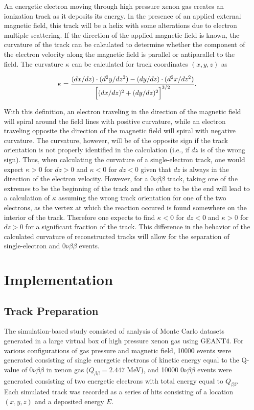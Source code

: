 \documentclass{JINST}
\begin{document}
An energetic electron moving through high pressure xenon gas creates an ionization track as it deposits its energy.  In the presence of an applied external magnetic field, this track will be a helix with some alterations due to electron multiple scattering.  If the direction of the applied magnetic field is known, the curvature of the track can be calculated to determine whether the component of the electron velocity along the magnetic field is parallel or antiparallel to the field.  The curvature $\kappa$ can be calculated for track coordinates $(x,y,z)$ as

\begin{equation}\label{eqn_curv}
\kappa = \frac{(dx/dz)\cdot(d^2y/dz^2) - (dy/dz)\cdot(d^2x/dz^2)}{\Bigl[(dx/dz)^2 + (dy/dz)^2\Bigr]^{3/2}}.
\end{equation}

With this definition, an electron traveling in the direction of the magnetic field will spiral around the field lines with positive curvature, while an electron traveling opposite the direction of the magnetic field will spiral with negative curvature.  The curvature, however, will be of the opposite sign if the track orientation is not properly identified in the calculation (i.e., if $dz$ is of the wrong sign).  Thus, when calculating the curvature of a single-electron track, one would expect $\kappa > 0$ for $dz > 0$ and $\kappa < 0$ for $dz < 0$ given that $dz$ is always in the direction of the electron velocity.  However, for a $0\nu\beta\beta$ track, taking one of the extremes to be the beginning of the track and the other to be the end will lead to a calculation of $\kappa$ assuming the wrong track orientation for one of the two electrons, as the vertex at which the reaction occured is found somewhere on the interior of the track.  Therefore one expects to find $\kappa < 0$ for $dz < 0$ and $\kappa > 0$ for $dz > 0$ for a significant fraction of the track.  This difference in the behavior of the calculated curvature of reconstructed tracks will allow for the separation of single-electron and $0\nu\beta\beta$ events.

\section{Implementation}

\subsection{Track Preparation}\label{ssec:track}
The simulation-based study consisted of analysis of Monte Carlo datasets generated in a large virtual box of high pressure xenon gas using GEANT4.  For various configurations of gas pressure and magnetic field, 10000 events were generated consisting of single energetic electrons of kinetic energy equal to the Q-value of $0\nu\beta\beta$ in xenon gas ($Q_{\beta\beta} = 2.447$ MeV), and 10000 $0\nu\beta\beta$ events were generated consisting of two energetic electrons with total energy equal to $Q_{\beta\beta}$.  Each simulated track was recorded as a series of hits consisting of a location $(x,y,z)$ and a deposited energy $E$.
\end{document}
